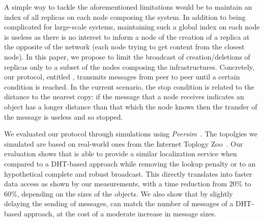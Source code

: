 A simple way to tackle the aforementioned limitations would be to
maintain an index of all replicas on each node composing the
system. In addition to being complicated  for large-scale
systems, maintaining such a global index on each node is useless as there
is no interest to inform a node of the creation of a replica at the
opposite of the network (each node trying to get content from the closest node).
%
In this paper, we propose to limit the broadcast of creation/deletions
of replicas only to a subset of the nodes composing the
infrastructures.  Concretely, our protocol, entitled \NAME, transmits
messages from peer to peer until a certain condition is reached. In
the current scenario, the stop condition is related to the distance to
the nearest copy: if the message that a node receives indicates an
object has a longer distance than that which the node knows then the
transfer of the message is useless and so stopped.




We evaluated our protocol through simulations using \textit{Peersim}~\cite{montresor2009peersim}. The topolgies we simulated are based on real-world ones from the Internet Toplogy
Zoo~\cite{knight2011internet}.  Our evaluation shows that \NAME is able to
provide a similar localization service when compared to a DHT-based
approach while removing the lookup penalty or to an hypothetical complete and robust broadcast. This directly translates
into faster data access as shown by our measurements, with a time
reduction from $20\%$ to $60\%$, depending on the sizes of the
objects. %
We also show that by slightly delaying the sending of messages, \NAME
can match the number of messages of a DHT-based approach, at the cost
of a moderate increase in message sizes.






